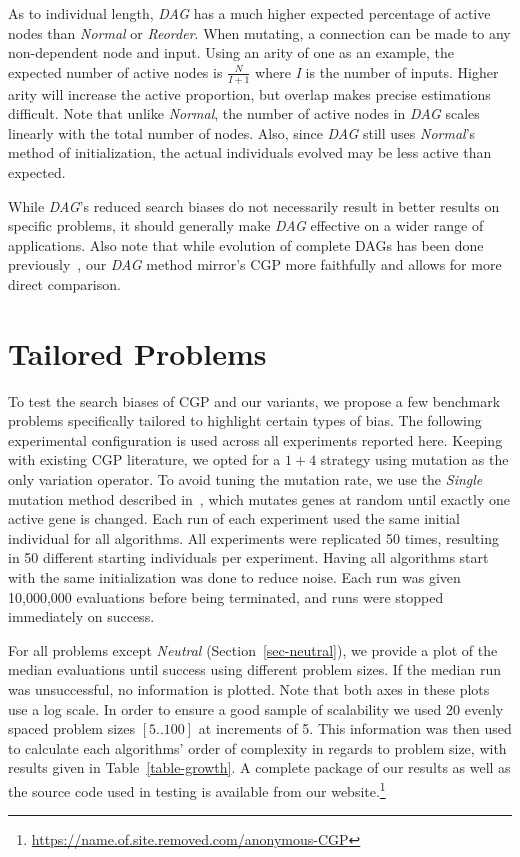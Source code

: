 \documentclass{sig-alternate}
\begin{document}
As to individual length, \emph{DAG} has a much higher expected percentage of active nodes
than \emph{Normal} or \emph{Reorder}.  When mutating, a connection can be made to
any non-dependent node and input.  Using an arity of one as an example, the
expected number of active nodes is $\frac{N}{I+1}$ where \emph{I} is the number
of inputs.  Higher arity will increase the active proportion, but overlap makes
precise estimations difficult.  Note that unlike \emph{Normal}, the number of
active nodes in \emph{DAG} scales linearly with the total number of nodes.  Also,
since \emph{DAG} still uses \emph{Normal}'s method of initialization, the actual
individuals evolved may be less active than expected.

While \emph{DAG}'s reduced search biases do not necessarily result in better results
on specific problems, it should generally make \emph{DAG} effective on a wider
range of applications.
Also note that while evolution of complete DAGs has been done previously~\cite{niehaus:2007:ggp},
our \emph{DAG} method mirror's CGP more faithfully and allows for more direct comparison.

\section{Tailored Problems}
\label{sec-tailored}
To test the search biases of CGP and our variants,
we propose a few benchmark problems specifically
tailored to highlight certain types of bias.
The following experimental configuration is used across all experiments reported here.
Keeping with existing CGP literature, we opted for a $1+4$ strategy using
mutation as the only variation operator.  To avoid tuning the mutation
rate, we use the \emph{Single} mutation method described in~\cite{goldman:2013:cgpwaste},
which mutates genes at random until exactly one active gene is changed.  
Each run of each experiment used the same initial individual for all algorithms.
All experiments were replicated 50 times, resulting in 50 different starting individuals per experiment.
Having all algorithms start with the same initialization was done to reduce noise.
Each
run was given 10,000,000 evaluations before being terminated, and runs were stopped
immediately on success.

For all problems except \emph{Neutral} (Section~\ref{sec-neutral}), we provide a plot of the median
evaluations until success using different problem sizes.  If the median run
was unsuccessful, no information is plotted.  Note that both axes in these plots
use a log scale.  In order to ensure a good sample of scalability we used 20
evenly spaced problem sizes $\left [ 5 .. 100 \right ]$ at increments of 5.
This information was then used to calculate each algorithms' order of complexity
in regards to problem size, with results given in Table~\ref{table-growth}.
A complete package of our results as well as the source code used in testing
is available from our website.\footnote{\url{https://name.of.site.removed.com/anonymous-CGP}}
\end{document}
